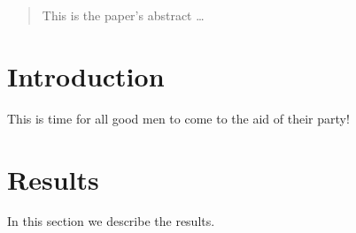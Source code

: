 \documentclass[12pt]{article}
\begin{document}
\maketitle

\begin{abstract}
This is the paper's abstract \ldots
\end{abstract}

\section{Introduction}
This is time for all good men to come to the aid of their party!

\section{Results}\label{results}
In this section we describe the results.
\end{document}
